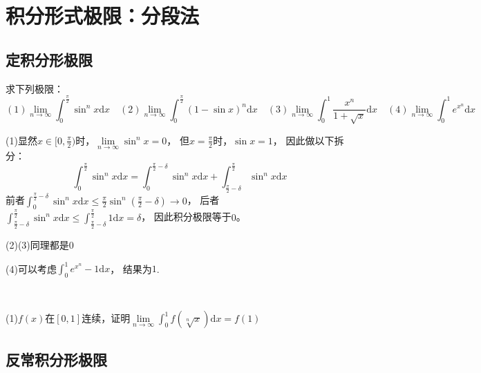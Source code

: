 \section{积分形式极限：分段法}

\subsection{定积分形极限}

\begin{exercise}[基础拆分法]
  求下列极限：
  \begin{equation*}
    (1)\lim \limits _{n \rightarrow \infty} \int_0^{\frac{\pi}{2}} \sin^n x\mathrm{d} x \quad
    (2)\lim \limits _{n \rightarrow \infty} \int_0^{\frac{\pi}{2}} (1 - \sin x)^n \mathrm{d} x\quad
    (3)\lim \limits _{n \rightarrow \infty} \int_0^1 \frac{x^n}{1 + \sqrt{x}}\mathrm{d} x\quad
    (4)\lim \limits _{n \rightarrow \infty} \int_0^1 e^{x^n} \mathrm{d} x
  \end{equation*}
\end{exercise}

\begin{solution}
  (1)显然$x \in [0, \frac{\pi}{2})$时，$\lim \limits _{n \rightarrow \infty} \sin^n x = 0$，
  但$x = \frac{\pi}{2}$时，$\sin x = 1$，
  因此做以下拆分：
  \begin{equation*}
    \int_0^{\frac{\pi}{2}} \sin^n x\mathrm{d} x = \int_0^{\frac{\pi}{2} - \delta} \sin^n x\mathrm{d} x + \int_{\frac{\pi}{2} - \delta}^{\frac{\pi}{2}} \sin^n x\mathrm{d} x
  \end{equation*}
  前者$\int_0^{\frac{\pi}{2} - \delta} \sin^n x \mathrm{d} x \leq \frac{\pi}{2} \sin^n (\frac{\pi}{2} - \delta) \rightarrow 0$，
  后者$\int_{\frac{\pi}{2} - \delta}^{\frac{\pi}{2}} \sin^n x\mathrm{d} x \leq \int_{\frac{\pi}{2} - \delta}^{\frac{\pi}{2}} 1 \mathrm{d} x = \delta$，
  因此积分极限等于$0$。

  (2)(3)同理都是$0$

  (4)可以考虑$\int_0^1 e^{x^n} - 1 \mathrm{d} x$，
  结果为$1$.
\end{solution}

~

\begin{exercise}[用分段法证明命题]
  (1)$f(x)$在$[0,1]$连续，证明$\lim \limits _{n \rightarrow \infty} \int_0^1 f(\sqrt[n]{x})\mathrm{d} x = f(1)$
\end{exercise}

\subsection{反常积分形极限}

